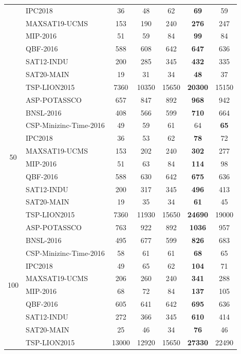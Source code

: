 \begin{tabular}{clccccc}
 & IPC2018 & 36 & 48 & 62 & \textbf{69} & 59 \\
 & MAXSAT19-UCMS & 153 & 190 & 240 & \textbf{276} & 247 \\
 & MIP-2016 & 51 & 59 & 84 & \textbf{99} & 84 \\
 & QBF-2016 & 588 & 608 & 642 & \textbf{647} & 636 \\
 & SAT12-INDU & 200 & 285 & 345 & \textbf{432} & 335 \\
 & SAT20-MAIN & 19 & 31 & 34 & \textbf{48} & 37 \\
 & TSP-LION2015 & 7360 & 10350 & 15650 & \textbf{20300} & 15150 \\
\midrule
\multirow{10}{*}{50} & ASP-POTASSCO & 657 & 847 & 892 & \textbf{968} & 942 \\
 & BNSL-2016 & 408 & 566 & 599 & \textbf{710} & 664 \\
 & CSP-Minizinc-Time-2016 & 49 & 59 & 61 & 64 & \textbf{65} \\
 & IPC2018 & 36 & 53 & 62 & \textbf{78} & 72 \\
 & MAXSAT19-UCMS & 153 & 202 & 240 & \textbf{302} & 277 \\
 & MIP-2016 & 51 & 63 & 84 & \textbf{114} & 98 \\
 & QBF-2016 & 588 & 630 & 642 & \textbf{675} & 636 \\
 & SAT12-INDU & 200 & 317 & 345 & \textbf{496} & 413 \\
 & SAT20-MAIN & 19 & 35 & 34 & \textbf{61} & 45 \\
 & TSP-LION2015 & 7360 & 11930 & 15650 & \textbf{24690} & 19000 \\
\midrule
\multirow{10}{*}{100} & ASP-POTASSCO & 763 & 922 & 892 & \textbf{1036} & 957 \\
 & BNSL-2016 & 495 & 677 & 599 & \textbf{826} & 683 \\
 & CSP-Minizinc-Time-2016 & 58 & 61 & 61 & \textbf{68} & 65 \\
 & IPC2018 & 49 & 65 & 62 & \textbf{104} & 71 \\
 & MAXSAT19-UCMS & 206 & 260 & 240 & \textbf{341} & 288 \\
 & MIP-2016 & 68 & 72 & 84 & \textbf{137} & 105 \\
 & QBF-2016 & 605 & 641 & 642 & \textbf{695} & 636 \\
 & SAT12-INDU & 272 & 366 & 345 & \textbf{610} & 414 \\
 & SAT20-MAIN & 25 & 46 & 34 & \textbf{76} & 46 \\
 & TSP-LION2015 & 13000 & 12920 & 15650 & \textbf{27330} & 22490 \\
\bottomrule
\end{tabular}
